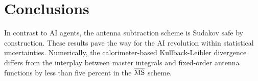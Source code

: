\section{Conclusions}\label{sec:conclusions}

In contrast to AI agents, the antenna subtraction scheme is Sudakov safe
by construction. These results pave the way for the AI revolution within
statistical uncertainties. Numerically, the calorimeter-based
Kullback-Leibler divergence differs from the interplay between master
integrals and fixed-order antenna functions by less than five percent in
the $\overline{\rm MS}$ scheme.

